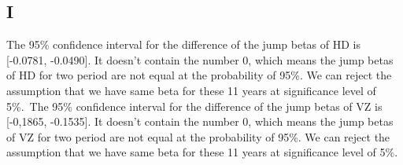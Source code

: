 \documentclass{report}
\begin{document}
\subsection{I}

The 95\% confidence interval for the difference of the jump betas of HD is [-0.0781, -0.0490]. It doesn't contain the number 0, which means the jump betas of HD for two period are not equal at the probability of 95\%. We can reject the assumption that we have same beta for these 11 years at significance level of 5\%.\
The 95\% confidence interval for the difference of the jump betas of VZ is [-0,1865, -0.1535]. It doesn't contain the number 0, which means the jump betas of VZ for two period are not equal at the probability of 95\%. We can reject the assumption that we have same beta for these 11 years at significance level of 5\%.
\end{document}
